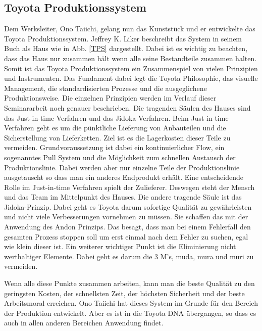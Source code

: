\documentclass[a4paper,12pt]{scrartcl}
\begin{document}
    
    
    
\subsection{Toyota Produktionssystem}
    
    Dem Werksleiter, Ono Taiichi, gelang nun das Kunststück und er entwickelte das Toyota Produktionssystem. Jeffrey K. Liker beschreibt das System in seinem Buch als Haus wie in Abb. \ref{TPS} dargestellt. Dabei ist es wichtig zu beachten, dass das Haus nur zusammen hält wenn alle seine Bestandteile zusammen halten. Somit ist das Toyota Produktionssystem ein Zusammenspiel von vielen Prinzipien und Instrumenten. Das Fundament dabei legt die Toyota Philosophie, das visuelle Management, die standardisierten Prozesse und die ausgeglichene Produktionsweise. Die einzelnen Prinzipien werden im Verlauf dieser Seminararbeit noch genauer beschrieben. Die tragenden Säulen des Hauses sind das Just-in-time Verfahren und das Jidoka Verfahren. Beim Just-in-time Verfahren geht es um die pünktliche Lieferung von Anbauteilen und die Sicherstellung von Lieferketten. Ziel ist es die Lagerkosten dieser Teile zu vermeiden. Grundvoraussetzung ist dabei ein kontinuierlicher Flow, ein sogenanntes Pull System und die Möglichkeit zum schnellen Austausch der Produktionslinie. Dabei werden aber nur einzelne Teile der Produktionslinie ausgetauscht so dass man ein anderes Endprodukt erhält. Eine entscheidende Rolle im Just-in-time Verfahren spielt der Zulieferer. Deswegen steht der Mensch und das Team im Mittelpunkt des Hauses. Die andere tragende Säule ist das Jidoka-Prinzip. Dabei geht es Toyota darum sofortige Qualität zu gewährleisten und nicht viele Verbesserungen vornehmen zu müssen. Sie schaffen das mit der Anwendung des Andon Prinzips. Das besagt, dass man bei einem Fehlerfall den gesamten Prozess stoppen soll um erst einmal nach dem Fehler zu suchen, egal wie klein dieser ist. Ein weiterer wichtiger Punkt ist die Eliminierung nicht werthaltiger Elemente. Dabei geht es darum die 3 M's, muda, mura und muri zu vermeiden. 
    
    Wenn alle diese Punkte zusammen arbeiten, kann man die beste Qualität zu den geringsten Kosten, der schnellsten Zeit, der höchsten Sicherheit und der beste Arbeitsmoral erreichen. Ono Taiichi hat dieses System im Grunde für den Bereich der Produktion entwickelt. Aber es ist in die Toyota DNA übergangen, so dass es auch in allen anderen Bereichen Anwendung findet.
\end{document}
